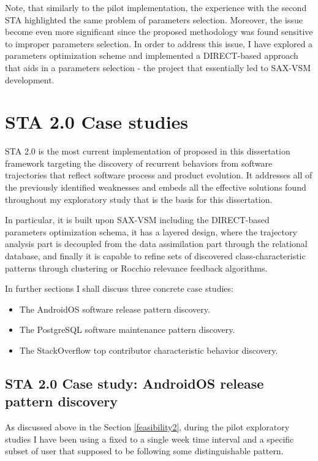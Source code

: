 Note, that similarly to the pilot implementation, the experience with the second STA highlighted the same problem of 
parameters selection. Moreover, the issue become even more significant since the proposed methodology was found sensitive to 
improper parameters selection. In order to address this issue, I have explored a parameters optimization scheme and 
implemented a DIRECT-based approach \cite{citeulike:12563460} that aids in a parameters selection - the project that 
essentially led to SAX-VSM development.

\section{STA 2.0 Case studies}
STA 2.0 is the most current implementation of proposed in this dissertation framework targeting the discovery of 
recurrent behaviors from software trajectories that reflect software process and product evolution. 
It addresses all of the previously identified weaknesses 
and embeds all the effective solutions found throughout my exploratory study that is the basis for this dissertation. 

In particular, it is built upon SAX-VSM including the DIRECT-based parameters optimization schema, it has a layered design,
where the trajectory analysis part is decoupled from the data assimilation part through the relational database, and finally 
it is capable to refine sets of discovered class-characteristic patterns through clustering or Rocchio relevance feedback algorithms.

In further sections I shall discuss three concrete case studies:
\begin{itemize}
 \item The AndroidOS software release pattern discovery.
 \item The PostgreSQL software maintenance pattern discovery.
 \item The StackOverflow top contributor characteristic behavior discovery.
\end{itemize}

\subsection{STA 2.0 Case study: AndroidOS release pattern discovery}
As discussed above in the Section \ref{feasibility2}, during the pilot exploratory studies I have been using a fixed to a single week time interval and a specific subset of user that supposed to be following some distinguishable pattern. 

